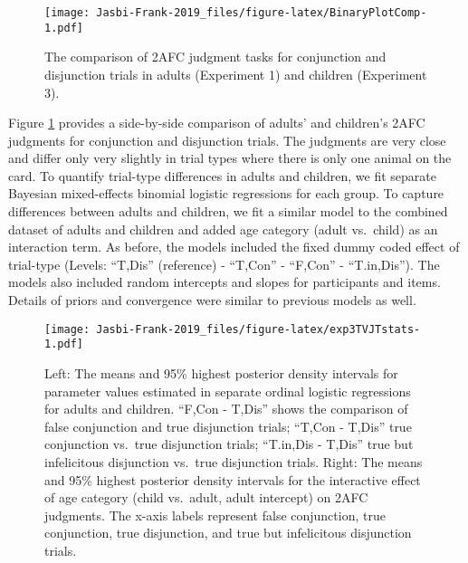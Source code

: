 \documentclass[,man,floatsintext]{apa6}
\begin{document}
\begin{figure}
\centering
\texttt{[image: Jasbi-Frank-2019\_files/figure-latex/BinaryPlotComp-1.pdf]}
\caption{\label{fig:BinaryPlotComp}The comparison of 2AFC judgment tasks for conjunction and disjunction trials in adults (Experiment 1) and children (Experiment 3).}
\end{figure}

Figure \ref{fig:BinaryPlotComp} provides a side-by-side comparison of adults' and children's 2AFC judgments for conjunction and disjunction trials. The judgments are very close and differ only very slightly in trial types where there is only one animal on the card. To quantify trial-type differences in adults and children, we fit separate Bayesian mixed-effects binomial logistic regressions for each group. To capture differences between adults and children, we fit a similar model to the combined dataset of adults and children and added age category (adult vs.~child) as an interaction term. As before, the models included the fixed dummy coded effect of trial-type (Levels: \enquote{T,Dis} (reference) - \enquote{T,Con} - \enquote{F,Con} - \enquote{T.in,Dis}). The models also included random intercepts and slopes for participants and items. Details of priors and convergence were similar to previous models as well.

\begin{figure}
\centering
\texttt{[image: Jasbi-Frank-2019\_files/figure-latex/exp3TVJTstats-1.pdf]}
\caption{\label{fig:exp3TVJTstats}Left: The means and 95\% highest posterior density intervals for parameter values estimated in separate ordinal logistic regressions for adults and children. \enquote{F,Con - T,Dis} shows the comparison of false conjunction and true disjunction trials; \enquote{T,Con - T,Dis} true conjunction vs.~true disjunction trials; \enquote{T.in,Dis - T,Dis} true but infelicitous disjunction vs.~true disjunction trials. Right: The means and 95\% highest posterior density intervals for the interactive effect of age category (child vs.~adult, adult intercept) on 2AFC judgments. The x-axis labels represent false conjunction, true conjunction, true disjunction, and true but infelicitous disjunction trials.}
\end{figure}
\end{document}
